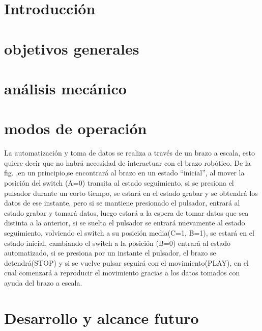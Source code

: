 \documentclass[conference]{IEEEtran}
\begin{document}
\section{Introducción}



\section{objetivos generales}



\section{análisis mecánico}



\section{modos de operación}


   
La automatización y toma de datos se realiza a través de un brazo a
escala, esto quiere decir que no habrá necesidad de interactuar con
el brazo robótico.
De la fig. ,en un principio,se encontrará al brazo en un estado “inicial”, 
al mover la posición del switch (A=0) transita al estado seguimiento, si se 
presiona el pulsador durante un corto tiempo, se estará en el estado grabar 
y se obtendrá los datos de ese instante, pero si se mantiene presionado el 
pulsador, entrará al estado grabar y tomará datos, luego estará a la espera 
de tomar datos que sea distinta a la anterior, si se suelta el pulsador se 
entrará nuevamente al estado seguimiento, volviendo el switch a su posición 
media(C=1, B=1), se estará en el estado inicial, cambiando el switch a la 
posición (B=0) entrará al estado automatizado, si se presiona por un 
instante el pulsador, el brazo se detendrá(STOP) y si se vuelve pulsar 
seguirá con el movimiento(PLAY), en el cual comenzará a reproducir el 
movimiento gracias a los datos tomados con ayuda del brazo a escala.

\section{Desarrollo y alcance futuro}




\end{document}
